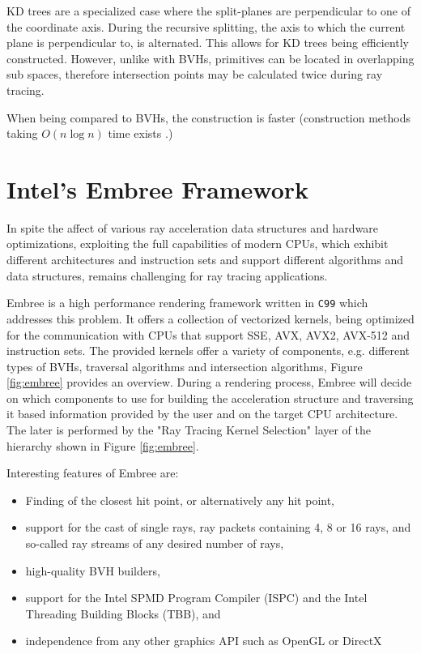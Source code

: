 KD trees are a specialized case where the split-planes are perpendicular to one of the coordinate axis. During the recursive splitting, the axis to which the current plane is perpendicular to, is alternated. This allows for KD trees being efficiently constructed. However,  unlike with BVHs, primitives can be located in overlapping sub spaces, therefore intersection points may be calculated twice during ray tracing. 

When being compared to BVHs, the construction is faster (construction methods taking $O(n\log n)$ time exists \cite{wald2001interactive}.)

\section{Intel\textregistered's Embree Framework}
In spite the affect of various ray acceleration data structures and hardware optimizations, exploiting the full capabilities of modern CPUs, which exhibit different architectures and instruction sets and support different algorithms and data structures, remains challenging for ray tracing applications. 

Embree is a high performance rendering framework written in \texttt{C99} which addresses this problem. It offers a collection of vectorized kernels, being optimized for the communication with CPUs that support SSE, AVX, AVX2, AVX-512 and instruction sets. The provided kernels offer a variety of components, e.g. different types of BVHs, traversal algorithms and intersection algorithms, Figure \ref{fig:embree} provides an overview.
During a rendering process, Embree will decide on which components to use for building the acceleration structure and traversing it based information provided by the user and on the target CPU architecture. The later is performed by the "Ray Tracing Kernel Selection" layer of the hierarchy shown in Figure \ref{fig:embree}.

Interesting features of Embree are:
\begin{itemize}
	\setlength\itemsep{0.05em}
	\item 	Finding of the closest hit point, or alternatively any hit point,
	\item 	support for the cast of single rays, ray packets containing 4, 8 or 16 rays, and so-called ray streams of any desired number of rays,
	\item 	high-quality BVH builders,
	\item 	support for the Intel SPMD Program Compiler (ISPC) and the Intel Threading Building Blocks (TBB), and
	\item 	independence from any other graphics API such as OpenGL or DirectX
\end{itemize}

